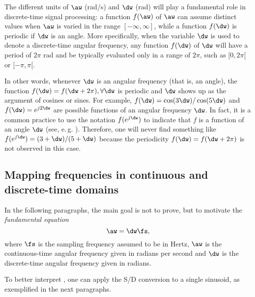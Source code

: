 The different units of $\aw$ (rad/s) and $\dw$ (rad) will play a fundamental role in discrete-time signal processing: a function $f(\aw)$ of $\aw$ can assume distinct values when $\aw$ is varied in the range $[- \infty, \infty]$, while a
function $f(\dw)$ is periodic if $\dw$ is an angle. More specifically, when the variable $\dw$ is used to denote a discrete-time angular frequency, any function $f(\dw)$ of $\dw$ will have a period of $2 \pi$ rad and be typically evaluated only in a range of $2\pi$, such as $[0, 2\pi[$ or $[-\pi, \pi[$.

In other words, whenever $\dw$ is an angular frequency (that is, an angle), the function $f(\dw) = f(\dw + 2 \pi), \forall \dw$ is periodic and $\dw$ shows up as the argument of cosines or sines. For example, $f(\dw) = \cos(3 \dw) / \cos(5 \dw)$ and $f(\dw) = e^{j 2 \dw}$ are possible functions of an angular frequency $\dw$. 
In fact, it is a common practice to use the
notation $f(e^{j\dw})$ to indicate that $f$ is a function of an angle $\dw$ (see, e.\,g. ).
Therefore, one will never find something like $f(e^{j\dw})=(3+\dw)/(5+\dw)$ because the periodicity $f(\dw) = f(\dw + 2 \pi)$ is not observed in this case.

\subsection{Mapping frequencies in continuous and discrete-time domains}

In the following paragraphs, the main goal is not to prove, but to motivate the \emph{fundamental equation}
\begin{equation}
\aw = \dw \fs,
\label{eq:freqdiscrete2continuous} %
\end{equation}
where $\fs$ is the sampling frequency assumed to be in Hertz, $\aw$ is the continuous-time angular frequency given in radians per second and $\dw$ is the discrete-time angular frequency given in radians.

To better interpret , one can apply the S/D conversion to a single sinusoid, as exemplified in the next paragraphs.



